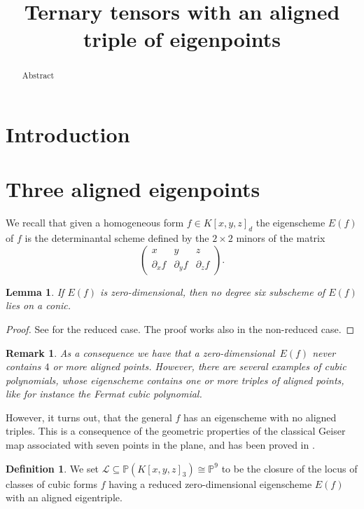 \documentclass{amsart}
\title{Ternary tensors with an aligned triple of eigenpoints}
\author{}
\date{}
\theoremstyle{plain}
\newtheorem{lem}[theorem]{Lemma}
\newtheorem{rmk}[theorem]{Remark}
\theoremstyle{definition}
\newtheorem{definition}[theorem]{Definition}
\newcommand{\p}{\mathbb{P}}
\newcommand{\de}{\partial}
\begin{document}
\begin{abstract}
Abstract
\end{abstract}

\maketitle


\section{Introduction}
\section{Three aligned eigenpoints}
We recall that given a homogeneous form $f\in K[x,y,z]_d$ the eigenscheme $E(f)$ of $f$ is the determinantal scheme defined by the $2\times 2 $ minors of the matrix
%
\begin{equation} 
\label{eq:def_matrix}
    \begin{pmatrix}
    x & y & z \\
    \de_x f & \de_y f & \de_z f
    \end{pmatrix}.
\end{equation}
%   
\begin{lem}
If $E(f)$ is zero-dimensional, then
no degree six subscheme of $E(f)$ lies on a conic.
\end{lem}
\begin{proof}
See \cite[Lemma~9.1]{OS1} for the reduced case. The proof works also in the non-reduced case.
\end{proof}


\begin{rmk}
As a consequence we have that a zero-dimensional~$E(f)$ never contains $4$ or more aligned points. However, there are several examples of cubic polynomials, whose eigenscheme contains one or more triples of aligned points, like for instance the Fermat cubic polynomial.
\end{rmk}
However, it turns out, that the general $f$ has an eigenscheme with no aligned triples. This is a consequence of the geometric properties of the classical Geiser map associated with seven points in the plane, and has been proved in \cite[Proposition 4.5]{BGV}.

\begin{definition}
 We set $\mathcal{L} \subseteq \p(K[x,y,z]_3) \cong \p^9$ to be the closure of the locus of classes of cubic forms $f$ having a reduced zero-dimensional eigenscheme $E(f)$ with an aligned eigentriple.
\end{definition}
\end{document}
